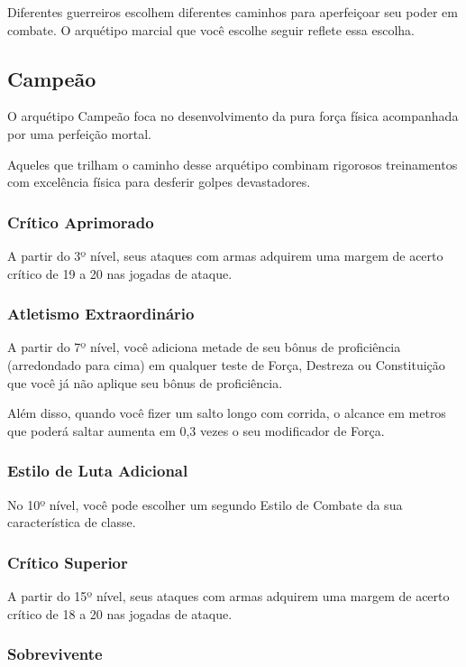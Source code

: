 \documentclass{RPG_Adventure}[2021/10/20]
\begin{document}
Diferentes guerreiros escolhem diferentes caminhos para aperfeiçoar seu poder em
combate. O arquétipo marcial que você escolhe seguir reflete essa escolha.

\subsection*{Campeão}%
\label{sub:campeao}

O arquétipo Campeão foca no desenvolvimento da pura força física acompanhada por
uma perfeição mortal.

Aqueles que trilham o caminho desse arquétipo combinam rigorosos treinamentos
com excelência física para desferir golpes devastadores.

\subsubsection{Crítico Aprimorado}%

A partir do 3º nível, seus ataques com armas adquirem uma margem de acerto
crítico de 19 a 20 nas jogadas de ataque.

\subsubsection{Atletismo Extraordinário}%

A partir do 7º nível, você adiciona metade de seu bônus de proficiência
(arredondado para cima) em qualquer teste de Força, Destreza ou Constituição que
você já não aplique seu bônus de proficiência.

Além disso, quando você fizer um salto longo com corrida, o alcance em metros
que poderá saltar aumenta em 0,3 vezes o seu modificador de Força.

\subsubsection{Estilo de Luta Adicional}%

No 10º nível, você pode escolher um segundo Estilo de Combate da sua
característica de classe.

\subsubsection{Crítico Superior}%

A partir do 15º nível, seus ataques com armas adquirem uma margem de acerto
crítico de 18 a 20 nas jogadas de ataque.

\subsubsection{Sobrevivente}%
\end{document}
